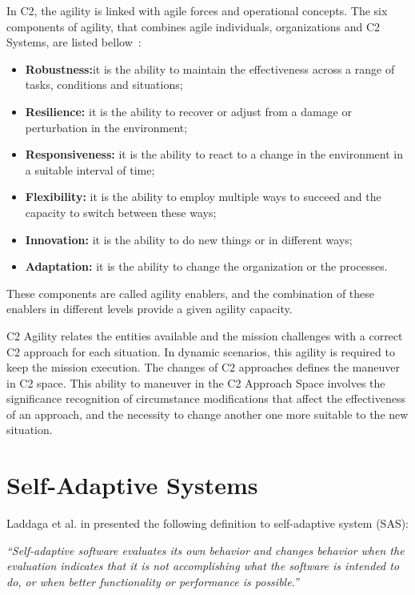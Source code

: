 In C2, the \gls{agility} is linked with agile forces and operational concepts. The six components of agility, that combines agile individuals, organizations and C2 Systems, are listed bellow~\cite{Power01}:

\begin{itemize}
    \item \textbf{Robustness:}it is the ability to maintain the effectiveness across a range of tasks, conditions and situations;
    \item \textbf{Resilience:} it is the ability to recover or adjust from a damage or perturbation in the environment;
    \item \textbf{Responsiveness:} it is the ability to react to a change in the environment in a suitable interval of time;
    \item \textbf{Flexibility:} it is the ability to employ multiple ways to succeed and the capacity to switch between these ways;
    \item \textbf{Innovation:} it is the ability to do new things or in different ways;
    \item \textbf{Adaptation:} it is the ability to change the organization or the processes.
\end{itemize}

These components are called agility enablers, and the combination of these enablers in different levels provide a given agility capacity\cite{FRANCE2014}.

C2 Agility relates the entities available and the mission challenges with a correct C2 approach for each situation. In dynamic scenarios, this agility is required to keep the mission execution. The changes of C2 approaches defines the maneuver in C2 space. This ability to maneuver in the C2 Approach Space involves the significance recognition of circumstance modifications that affect the effectiveness of an approach, and the necessity to change another one more suitable to the new situation.



\section {Self-Adaptive Systems}

Laddaga et al. in \cite{SAS01} presented the following definition to self-adaptive system (SAS):

\textit{``Self-adaptive software evaluates its own behavior and changes behavior when the evaluation indicates that it is not accomplishing what the software is intended to do, or when better functionality or performance is possible.''}

